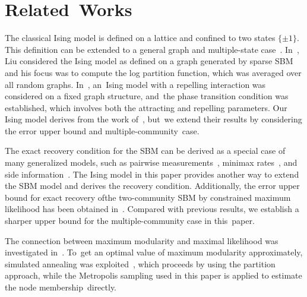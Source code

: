 \documentclass[entropy,article,accept,moreauthors,pdftex]{Definitions/mdpi}
\newcommand{\1}{\mathbbm{1}}
\begin{document}
\section{Related~Works}
The classical Ising model is defined on a lattice and confined to two states $\{\pm 1\}$. This definition
can be extended to a general graph and multiple-state case~\cite{potts1952some}. In~\cite{liu2017log}, Liu considered
the Ising model as defined on a graph generated by sparse SBM and his focus was to compute the log partition function,
which was averaged over all random graphs. In~\cite{berthet2019exact}, an~Ising model with a repelling interaction
was considered on a fixed graph structure, and~the phase transition condition was established, which involves both the attracting and repelling
parameters. Our Ising model derives from the work of~\cite{ye2020exact}, but~we extend their results by considering the error upper bound and
multiple-community~case.

The exact recovery condition for the SBM can be derived as a special case of many generalized models, such as pairwise measurements~\cite{chen2016information},
minimax rates~\cite{hajek2016achieving}, and side information~\cite{saad2018community}. The Ising model in this paper provides another way to extend the
SBM model and derives the recovery condition. Additionally,
the error upper bound for exact recovery of\linebreak the two-community SBM by constrained maximum likelihood has been obtained in~\cite{abbe2015exact}.
Compared with previous results, we establish a sharper upper bound for the multiple-community case in this~paper.

The connection between maximum modularity and maximal likelihood was investigated in~\cite{newman2016equivalence}. To~get an optimal value
of maximum modularity approximately, simulated annealing was exploited~\cite{he2016fast}, which proceeds by using the partition approach, while the Metropolis sampling
used in this paper is applied to estimate the node membership~directly.

\end{document}
